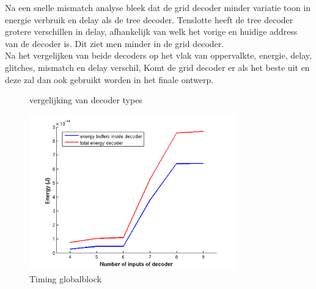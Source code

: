 Na een snelle mismatch analyse bleek dat de grid decoder minder variatie toon in energie verbruik en delay als de tree decoder. Tenslotte heeft de tree decoder grotere verschillen in delay, afhankelijk van welk het vorige en huidige address van de decoder is. Dit ziet men minder in de grid decoder. \\
Na het vergelijken van beide decoders op het vlak van oppervalkte, energie, delay, glitches, mismatch en delay verschil, Komt de grid decoder er als het beste uit en deze zal dan ook gebruikt worden in het finale ontwerp.


\begin{figure}[h!]
\centering
{}
\caption{vergelijking van decoder types}
\end{figure}


\begin{figure}[h!]
  \centering
  \includegraphics[width=0.8\textwidth]{../fig/hfdst-decoders-egrid.png}
  \caption{Timing globalblock}
  \label{fig:decoder_egrid}
\end{figure}


